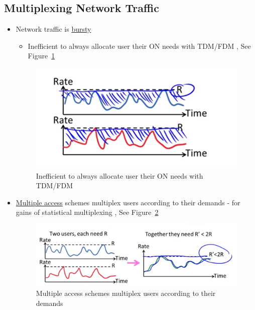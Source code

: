 \documentclass[12pt]{ctexart}   %
\begin{document}
	\subsection{Multiplexing Network Traffic}
	\begin{itemize}
		\item Network traffic is \underline{bursty}
		\begin{itemize}
			\item Inefficient to always allocate user their ON needs with TDM/FDM , See Figure~\ref{fig:3-3-4}
		\end{itemize}
		
		\begin{figure}[h!] %
		\centering
		 \includegraphics[scale=0.7]{images/3-3-4}
		\caption{ Inefficient to always allocate user their ON needs with TDM/FDM}
		 \label{fig:3-3-4}
		 \end{figure}
		 
		 \item \underline{Multiple access} schemes multiplex users according to their demands -  for gains of statistical multiplexing , See Figure~\ref{fig:3-3-5}
		 
		 \begin{figure}[h!] %
		\centering
		 \includegraphics[scale=0.7]{images/3-3-5}
		\caption{ Multiple access schemes multiplex users according to their demands}
		 \label{fig:3-3-5}
		 \end{figure}
	\end{itemize}
	
\end{document}
